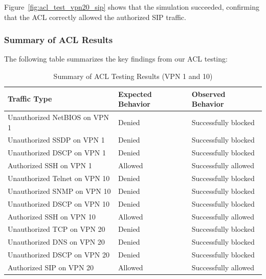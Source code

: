 \documentclass[12pt,english]{report}
\begin{document}
Figure~\ref{fig:acl_test_vpn20_sip} shows that the simulation succeeded, confirming that the ACL correctly allowed the authorized SIP traffic.

\subsubsection{Summary of ACL Results}

The following table summarizes the key findings from our ACL testing:

\begin{table}[h]
    \centering
    \footnotesize
    \caption{Summary of ACL Testing Results (VPN 1 and 10)}
    \label{tab:acl_results_part1}
    \begin{tabularx}{\linewidth}{@{}>{\raggedright\arraybackslash}p{6cm}>{\centering\arraybackslash}p{3cm}>{\raggedright\arraybackslash}X@{}}
        \toprule
        \textbf{Traffic Type} & \textbf{Expected Behavior} & \textbf{Observed Behavior} \\
        \midrule
        Unauthorized NetBIOS on VPN 1 & Denied & Successfully blocked \\
        \midrule
        Unauthorized SSDP on VPN 1 & Denied & Successfully blocked \\
        \midrule
        Unauthorized DSCP on VPN 1 & Denied & Successfully blocked \\
        \midrule
        Authorized SSH on VPN 1 & Allowed & Successfully allowed \\
        \midrule
        Unauthorized Telnet on VPN 10 & Denied & Successfully blocked \\
        \midrule
        Unauthorized SNMP on VPN 10 & Denied & Successfully blocked \\
        \midrule
        Unauthorized DSCP on VPN 10 & Denied & Successfully blocked \\
        \midrule
        Authorized SSH on VPN 10 & Allowed & Successfully allowed \\
        \midrule
        Unauthorized TCP on VPN 20 & Denied & Successfully blocked \\
        \midrule
        Unauthorized DNS on VPN 20 & Denied & Successfully blocked \\
        \midrule
        Unauthorized DSCP on VPN 20 & Denied & Successfully blocked \\
        \midrule
        Authorized SIP on VPN 20 & Allowed & Successfully allowed \\
        \bottomrule
    \end{tabularx}
\end{table}
\newpage
\end{document}
